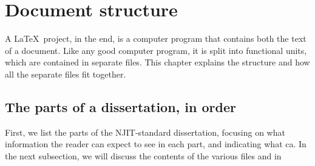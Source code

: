 
\chapter{Document structure}

A \LaTeX\ project, in the end, is a computer program that contains both the text of a document. Like any good computer program, it is split into functional units, which are contained in separate files. This chapter explains the structure and how all the separate files fit together.


\section*{The parts of a dissertation, in order}

First, we list the parts of the NJIT-standard dissertation, focusing on what information the reader can expect to see in each part, and indicating what ca. In the next subsection, we will discuss the contents of the various files and in
